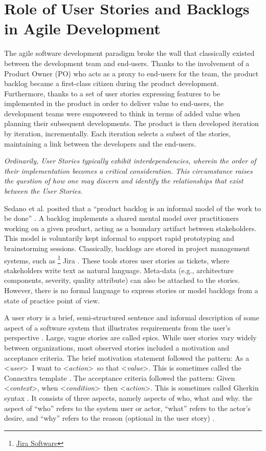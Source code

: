 \section{Role of User Stories and Backlogs in Agile Development}\label{us}
The agile software development paradigm broke the wall that classically existed between the development team and end-users. Thanks to the involvement of a Product Owner (PO) who acts as a proxy to end-users for the team, the product backlog \cite{sedano2019product} became a ﬁrst-class citizen during the product development. Furthermore, thanks to a set of user stories expressing features to be implemented in the product in order to deliver value to end-users, the development teams were empowered to think in terms of added value when planning their subsequent developments. The product is then developed iteration by iteration, incrementally. Each iteration selects a subset of the stories, maintaining a link between the developers and the end-users\cite{mosser2022modelling}. 

\emph{Ordinarily, User Stories typically exhibit interdependencies, wherein the order of their implementation becomes a critical consideration. This circumstance raises the question of how one may discern and identify the relationships that exist between the User Stories.}

Sedano et al. posited that a “product backlog is an informal model of the work to be done” \cite{sedano2019product}. A backlog implements a shared mental model over practitioners working on a given product, acting as a boundary artifact between stakeholders. This model is voluntarily kept informal to support rapid prototyping and brainstorming sessions. Classically, backlogs are stored in project management systems, such as \footnote{\href{https://www.atlassian.com/en/software/jira}{Jira Software}} Jira . These tools stores user stories as tickets, where stakeholders write text as natural language. Meta-data (e.g., architecture components, severity, quality attribute) can also be attached to the stories. However, there is no formal language to express stories or model backlogs from a state of practice point of view.

A user story is a brief, semi-structured sentence and informal description of some aspect of a software system that illustrates requirements from the user’s perspective \cite{raharjana2021user}. Large, vague stories are called epics. While user stories vary widely between organizations, most observed stories included a motivation and acceptance criteria. The brief motivation statement followed the pattern:  As a  \textless\emph{user}\textgreater\ I want to \textless\emph{action}\textgreater\ so that \textless\emph{value}\textgreater. This is sometimes called the Connextra template . The acceptance criteria followed the pattern: Given \textless\emph{context}\textgreater, when \textless\emph{condition}\textgreater \  then \textless\emph{action}\textgreater. This is sometimes called Gherkin syntax \cite{wynne2017cucumber}. It consists of three aspects, namely aspects of who, what and why. the aspect of “who” refers to the system user or actor, “what” refers to the actor’s desire, and “why” refers to the reason (optional in the user story) \cite{raharjana2021user}.


